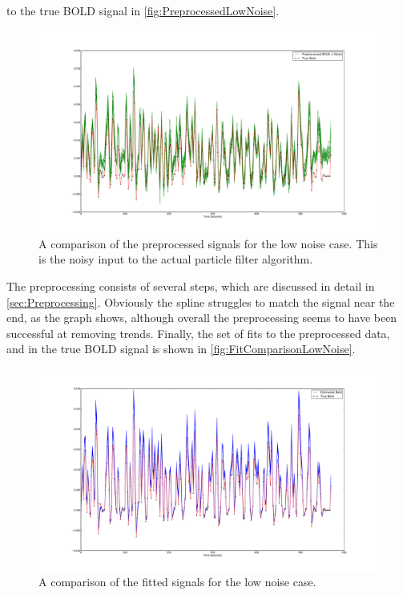 to the true BOLD signal in \autoref{fig:PreprocessedLowNoise}.
\begin{figure}
\label{fig:PreprocessedLowNoise}
\includegraphics[trim=6cm 3cm 6cm 3cm,width=16cm]{images/preprocessed_lownoise}
\caption{A comparison of the preprocessed signals for the low noise case. This is the
noisy input to the actual particle filter algorithm.}
\end{figure}
The preprocessing consists of several steps, which are discussed in detail in \autoref{sec:Preprocessing}.
Obviously the spline struggles to match the signal near the end, as the graph shows, although 
overall the preprocessing seems to have been successful at removing trends. Finally, the 
set of fits to the preprocessed data, and in 
the true BOLD signal is shown in \autoref{fig:FitComparisonLowNoise}.
\begin{figure}
\label{fig:FitComparisonLowNoise}
\includegraphics[trim=6cm 3cm 6cm 3cm,width=16cm]{images/comparison_lownoise}
\caption{A comparison of the fitted signals for the low noise case.}
\end{figure}
